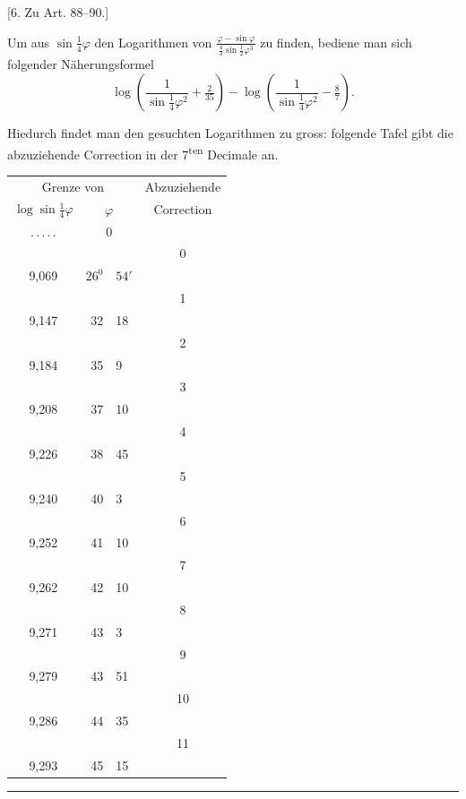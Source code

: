 \begin{center}
[6. Zu Art. 88–90.]
\end{center}
Um aus \(\sin\tfrac14\varphi\) den Logarithmen von \(\frac{\varphi-\sin\varphi}{\tfrac43\sin\tfrac12\varphi^3}\) zu finden, bediene man sich folgender Näherungsformel
\[
\log\left(\frac{1}{\sin\tfrac14\varphi^2}+\tfrac{2}{35}\right)-\log\left(\frac{1}{\sin\tfrac14\varphi^2}-\tfrac87\right).
\]

Hiedurch findet man den gesuchten Logarithmen zu gross: folgende Tafel gibt die abzuziehende Correction in der 7\textsuperscript{ten} Decimale an.
\begin{center}
\begingroup\renewcommand{\arraystretch}{.7}
\begin{tabular}{c|r@{\ }l|c}
\multicolumn{3}{c|}{Grenze von}&Abzuziehende\\
\(\log\sin\tfrac14\varphi\)&\multicolumn{2}{c|}{\(\varphi\)}&Correction\\
\hline
.\,.\,.\,.\,.&\multicolumn{2}{c|}{0}&\\
&&&0\\
9,069&\(26^0\)&\(54'\)&\\
&&&1\\
9,147&32&18&\\
&&&2\\
9,184&35&9&\\
&&&3\\
9,208&37&10&\\
&&&4\\
9,226&38&45&\\
&&&5\\
9,240&40&3&\\
&&&6\\
9,252&41&10&\\
&&&7\\
9,262&42&10&\\
&&&8\\
9,271&43&3&\\
&&&9\\
9,279&43&51&\\
&&&10\\
9,286&44&35&\\
&&&11\\
9,293&45&15&
\end{tabular}
\endgroup
\end{center}
\begin{center}\rule{.22\textwidth}{.35pt}\end{center}

